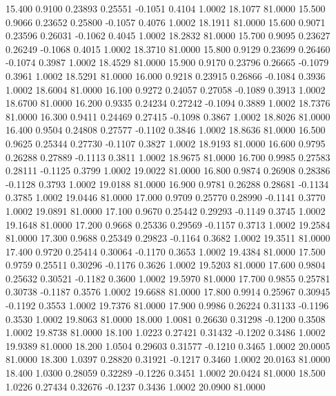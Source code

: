   15.400   0.9100   0.23893   0.25551  -0.1051   0.4104   1.0002  18.1077  81.0000
  15.500   0.9066   0.23652   0.25800  -0.1057   0.4076   1.0002  18.1911  81.0000
  15.600   0.9071   0.23596   0.26031  -0.1062   0.4045   1.0002  18.2832  81.0000
  15.700   0.9095   0.23627   0.26249  -0.1068   0.4015   1.0002  18.3710  81.0000
  15.800   0.9129   0.23699   0.26460  -0.1074   0.3987   1.0002  18.4529  81.0000
  15.900   0.9170   0.23796   0.26665  -0.1079   0.3961   1.0002  18.5291  81.0000
  16.000   0.9218   0.23915   0.26866  -0.1084   0.3936   1.0002  18.6004  81.0000
  16.100   0.9272   0.24057   0.27058  -0.1089   0.3913   1.0002  18.6700  81.0000
  16.200   0.9335   0.24234   0.27242  -0.1094   0.3889   1.0002  18.7376  81.0000
  16.300   0.9411   0.24469   0.27415  -0.1098   0.3867   1.0002  18.8026  81.0000
  16.400   0.9504   0.24808   0.27577  -0.1102   0.3846   1.0002  18.8636  81.0000
  16.500   0.9625   0.25344   0.27730  -0.1107   0.3827   1.0002  18.9193  81.0000
  16.600   0.9795   0.26288   0.27889  -0.1113   0.3811   1.0002  18.9675  81.0000
  16.700   0.9985   0.27583   0.28111  -0.1125   0.3799   1.0002  19.0022  81.0000
  16.800   0.9874   0.26908   0.28386  -0.1128   0.3793   1.0002  19.0188  81.0000
  16.900   0.9781   0.26288   0.28681  -0.1134   0.3785   1.0002  19.0446  81.0000
  17.000   0.9709   0.25770   0.28990  -0.1141   0.3770   1.0002  19.0891  81.0000
  17.100   0.9670   0.25442   0.29293  -0.1149   0.3745   1.0002  19.1648  81.0000
  17.200   0.9668   0.25336   0.29569  -0.1157   0.3713   1.0002  19.2584  81.0000
  17.300   0.9688   0.25349   0.29823  -0.1164   0.3682   1.0002  19.3511  81.0000
  17.400   0.9720   0.25414   0.30064  -0.1170   0.3653   1.0002  19.4384  81.0000
  17.500   0.9759   0.25511   0.30296  -0.1176   0.3626   1.0002  19.5203  81.0000
  17.600   0.9804   0.25632   0.30521  -0.1182   0.3600   1.0002  19.5970  81.0000
  17.700   0.9855   0.25781   0.30738  -0.1187   0.3576   1.0002  19.6688  81.0000
  17.800   0.9914   0.25967   0.30945  -0.1192   0.3553   1.0002  19.7376  81.0000
  17.900   0.9986   0.26224   0.31133  -0.1196   0.3530   1.0002  19.8063  81.0000
  18.000   1.0081   0.26630   0.31298  -0.1200   0.3508   1.0002  19.8738  81.0000
  18.100   1.0223   0.27421   0.31432  -0.1202   0.3486   1.0002  19.9389  81.0000
  18.200   1.0504   0.29603   0.31577  -0.1210   0.3465   1.0002  20.0005  81.0000
  18.300   1.0397   0.28820   0.31921  -0.1217   0.3460   1.0002  20.0163  81.0000
  18.400   1.0300   0.28059   0.32289  -0.1226   0.3451   1.0002  20.0424  81.0000
  18.500   1.0226   0.27434   0.32676  -0.1237   0.3436   1.0002  20.0900  81.0000
